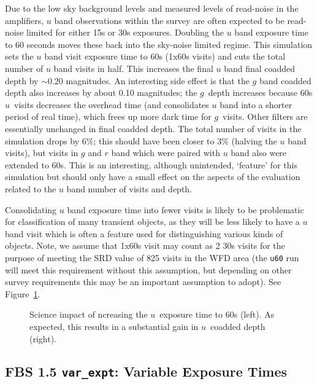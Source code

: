 Due to the low sky background levels and measured levels of read-noise in the amplifiers, $u$ band observations within the survey are often expected to be read-noise limited for either 15s or 30s exposures. Doubling the $u$ band exposure time to 60 seconds moves these back into the sky-noise limited regime. This simulation sets the $u$ band visit exposure time to 60s (1x60s visits) and cuts the total number of $u$ band visits in half. This increases the final $u$ band final coadded depth by $\sim$0.20 magnitudes. An interesting side effect is that the $g$ band coadded depth also increases by about 0.10 magnitudes; the $g$\ depth increases because 60s $u$\ visits decreases the overhead time (and consolidates $u$ band into a shorter period of real time), which frees up more dark time for $g$\ visits. Other filters are essentially unchanged in final coadded depth. The total number of visits in the simulation drops by 6\%; this should have been closer to 3\% (halving the $u$ band visits), but visits in $g$ and $r$ band which were paired with $u$ band also were extended to 60s. This is an interesting, although unintended, `feature' for this simulation but should only have a small effect on the aspects of the evaluation related to the $u$ band number of visits and depth. 

Consolidating $u$ band exposure time into fewer visits is likely to be problematic for classification of many transient objects, as they will be less likely to have a $u$ band visit which is often a feature used for distinguishing various kinds of objects. Note, we assume that 1x60s visit may count as 2 30s visits for the purpose of meeting the SRD value of 825 visits in the WFD area (the {\tt u60} run will meet this requirement without this assumption, but depending on other survey requirements this may be an important assumption to adopt). See Figure~\ref{fig:u60_radar}. 

\begin{figure}
\caption{Science impact of ncreasing the $u$\ exposure time to 60s (left).  As expected, this results in a substantial gain in $u$\ coadded depth (right).}
\label{fig:u60_radar}
\end{figure}

\subsection{FBS 1.5 {\tt var\_expt}: Variable Exposure Times}\label{ss:var_expt}

